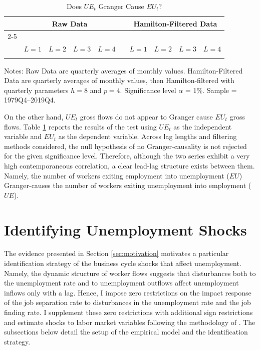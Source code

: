 \documentclass[12pt]{article}
\newcommand{\inputpath}{../output/tables/}
\begin{document}
\begin{table}[t!]
\centering
\caption{Does $UE_t$ Granger Cause $EU_t$?}\label{tab:granger_ue_eu}
\begin{threeparttable}\small
\begin{tabular}{c c c c c c c c c c}
\toprule
& \multicolumn{4}{c}{Raw Data} & & \multicolumn{4}{c}{Hamilton-Filtered Data} \\\cline{2-5}\cline{7-10}
& & & & & & & & &\\[-0.35cm]
& $L = 1$ & $L = 2$ & $L = 3$ & $L = 4$ & & $L = 1$ & $L = 2$ & $L = 3$ & $L = 4$\\ \hline
& & & & & & & & &\\[-0.35cm]

\bottomrule
\end{tabular}
\begin{tablenotes}\footnotesize
Notes: Raw Data are quarterly averages of monthly values. Hamilton-Filtered Data are quarterly averages of monthly values, then Hamilton-filtered with quarterly parameters $h = 8$ and $p = 4$. Significance level $\alpha$ = 1\%. Sample = 1979Q4--2019Q4.
\end{tablenotes}
\end{threeparttable}
\end{table}

On the other hand, $UE_t$ gross flows do not appear to Granger cause $EU_t$ gross flows. Table \ref{tab:granger_ue_eu} reports the results of the test using $UE_t$ as the independent variable and $EU_t$ as the dependent variable. Across lag lengths and filtering methods considered, the null hypothesis of no Granger-causality is not rejected for the given significance level. Therefore, although the two series exhibit a very high contemporaneous correlation, a clear lead-lag structure exists between them. Namely, the number of workers exiting employment into unemployment ($EU$) Granger-causes the number of workers exiting unemployment into employment ($UE$). 

\section{Identifying Unemployment Shocks}\label{sec:empirics}

The evidence presented in Section \ref{sec:motivation} motivates a particular identification strategy of the business cycle shocks that affect unemployment. Namely, the dynamic structure of worker flows suggests that disturbances both to the unemployment rate and to unemployment outflows affect unemployment inflows only with a lag. Hence, I impose zero restrictions on the impact response of the job separation rate to disturbances in the unemployment rate and the job finding rate. I supplement these zero restrictions with additional sign restrictions and estimate shocks to labor market variables following the methodology of \cite{Arias:2018aa}. The subsections below detail the setup of the empirical model and the identification strategy.
\end{document}
